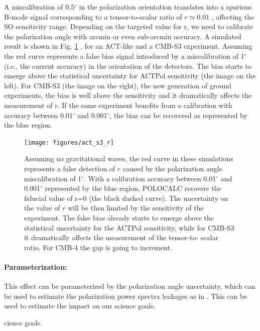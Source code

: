 A miscalibration of 0.5$^{\circ}$ in the polarization orientation translates
into a spurious B-mode signal corresponding to a tensor-to-scalar ratio of $r
\simeq 0.01$ \cite{abitbol16}, affecting the SO sensitivity range.  Depending
on the targeted value for r, we need to calibrate the polarization angle with
arcmin or even sub-arcmin accuracy. 
A simulated result is shown in Fig. \ref{plot_r:fig} \cite{nati2017}, for an
ACT-like and a CMB-S3 experiment. Assuming  the red curve represents a false
bias signal introduced by a miscalibration of 1$^{\circ}$ (i.e., the current
accuracy) in the orientation of the detectors.  The bias starts to emerge above
the statistical uncertainty for ACTPol sensitivity (the image on the left). For
CMB-S3 (the image on the right), the new generation of ground experiments, the
bias is well above the sensitivity and it dramatically affects the measurement
of r. If the same experiment benefits from a calibration with accuracy between
0.01$^{\circ}$ and 0.001$^{\circ}$, the bias can be recovered as represented by
the blue region.
 
\begin{figure}[ht]
\begin{center}
\texttt{[image: figures/act\_s3\_r]} 
\end{center}
\caption{Assuming no gravitational waves, the red curve in these simulations
represents a false detection of $r$ caused by the polarization angle
miscalibration of 1$^{\circ}$. With a calibration accuracy between
0.01$^{\circ}$ and 0.001$^{\circ}$ represented by the blue region, POLOCALC
\cite{nati2017} recovers the fiducial value of r=0 (the black dashed curve).
The uncertainty on the value of $r$ will be then limited by the sensitivity of
the experiment. The false bias already starts to emerge above the statistical
uncertainty for the ACTPol sensitivity, while for CMB-S3 it dramatically
affects the measurement of the tensor-to- scalar ratio. For CMB-4 the gap is
going to increment.}
\label{plot_r:fig}
\end{figure}

\paragraph{Parameterization:}
This effect can be parameterized by the polarization angle uncertainty, which
can be used to estimate the polarization power spectra leakages as in
\cite{nati2017}. This can be used to estimate the impact on our
science goals.

cience goals.
